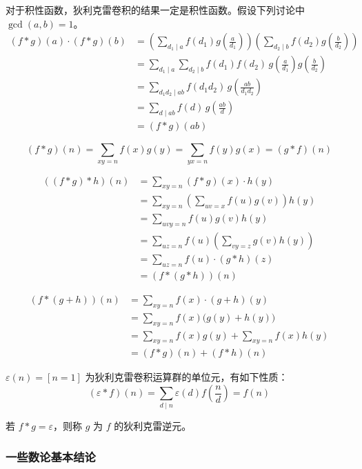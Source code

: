 对于积性函数，狄利克雷卷积的结果一定是积性函数。假设下列讨论中 $\gcd(a, b) = 1$。
\[
\begin{aligned}
(f * g)(a) \cdot (f * g)(b) 
&= \left( \sum_{d_1 \mid a} f(d_1)g\!\left(\frac{a}{d_1}\right) \right)
   \left( \sum_{d_2 \mid b} f(d_2) g\!\left(\frac{b}{d_2}\right) \right) \\
&= \sum_{d_1 \mid a}\sum_{d_2 \mid b} f(d_1)f(d_2)\, g\!\left(\frac{a}{d_1}\right) g\!\left(\frac{b}{d_2}\right) \\
&= \sum_{d_1d_2 \mid ab} f(d_1 d_2)\, g\!\left(\frac{ab}{d_1 d_2}\right) \\
&= \sum_{d \mid ab} f(d)\, g\!\left(\frac{ab}{d}\right) \\
&= (f * g)(ab)
\end{aligned}
\]

\[
(f * g)(n) = \sum_{xy=n} f(x)g(y) = \sum_{yx=n} f(y)g(x) = (g * f)(n)
\]

\[
\begin{aligned}
((f * g) * h)(n) 
&= \sum_{xy=n} (f * g)(x) \cdot h(y) \\
&= \sum_{xy=n} \left( \sum_{uv=x} f(u)g(v) \right) h(y) \\
&= \sum_{uvy=n} f(u)g(v)h(y) \\
&= \sum_{uz=n} f(u) \left( \sum_{vy=z} g(v)h(y) \right) \\
&= \sum_{uz=n} f(u) \cdot (g * h)(z) \\
&= (f * (g * h))(n)
\end{aligned}
\]

\[
\begin{aligned}
(f * (g + h))(n) 
&= \sum_{xy=n} f(x) \cdot (g + h)(y) \\
&= \sum_{xy=n} f(x) \bigl( g(y) + h(y) \bigr) \\
&= \sum_{xy=n} f(x)g(y) + \sum_{xy=n} f(x)h(y) \\
&= (f * g)(n) + (f * h)(n)
\end{aligned}
\]

$\varepsilon(n) = [n = 1]$ 为狄利克雷卷积运算群的单位元，有如下性质：
\[
(\varepsilon * f)(n) = \sum_{d \mid n} \varepsilon(d) f\!\left(\frac{n}{d}\right) = f(n)
\]

若 $f * g = \varepsilon$，则称 $g$ 为 $f$ 的狄利克雷逆元。

\subsubsection{一些数论基本结论}

